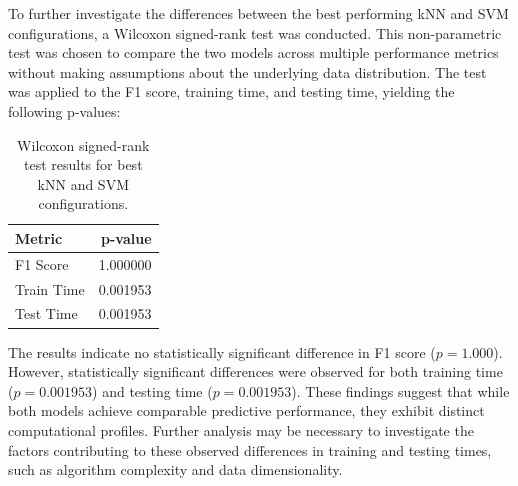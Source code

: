 To further investigate the differences between the best performing kNN and SVM configurations, a Wilcoxon signed-rank test was conducted. This non-parametric test was chosen to compare the two models across multiple performance metrics without making assumptions about the underlying data distribution. The test was applied to the F1 score, training time, and testing time, yielding the following p-values:

\begin{table}[h!]
\centering
\begin{tabular}{l|r}
Metric & p-value \\
\hline
F1 Score & 1.000000 \\
Train Time & 0.001953 \\
Test Time & 0.001953 \\
\end{tabular}
\caption{Wilcoxon signed-rank test results for best kNN and SVM configurations.}
\label{tab:wilcoxon_results}
\end{table}

The results indicate no statistically significant difference in F1 score ($p = 1.000$). 
However, statistically significant differences were observed for both training time ($p = 0.001953$) and 
testing time ($p = 0.001953$). These findings suggest that while both models achieve comparable predictive
performance, they exhibit distinct computational profiles. Further analysis may be necessary to investigate
the factors contributing to these observed differences in training and testing times, such as algorithm 
complexity and data dimensionality.